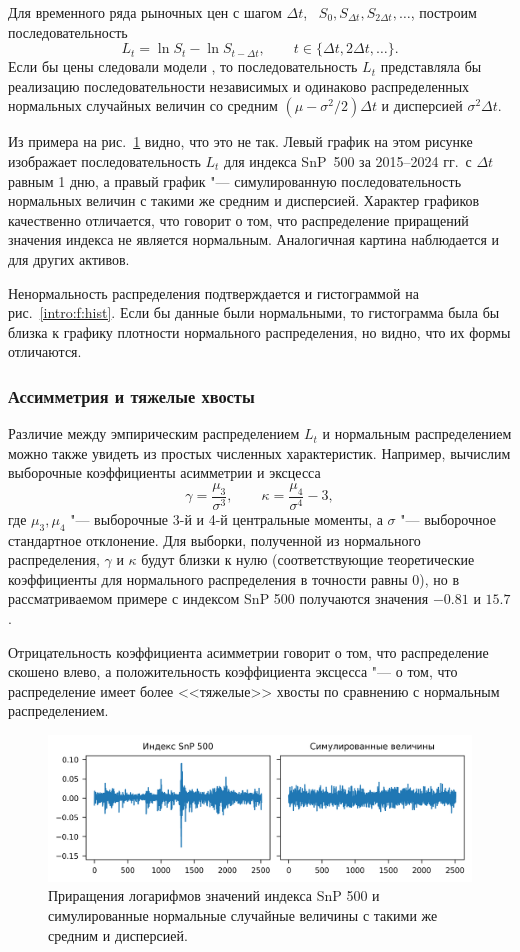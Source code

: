 Для временного ряда рыночных цен с шагом $\Delta t$, \te\ $S_0, S_{\Delta t}, S_{2\Delta t},\dots$, построим последовательность
\[
L_t = \ln S_t - \ln S_{t-\Delta t}, \qquad t\in \{\Delta t, 2\Delta t,\dots\}.
\]
Если бы цены следовали модели \bs, то последовательность $L_t$ представляла бы реализацию последовательности независимых и одинаково распределенных нормальных случайных величин со средним $(\mu-\sigma^2/2)\Delta t$ и дисперсией $\sigma^2\Delta t$.

Из примера на рис.~\ref{intro:f:real-vol} видно, что это не так.
Левый график на этом рисунке изображает последовательность $L_t$ для индекса SnP~500 за 2015--2024 гг.\ с $\Delta t$ равным 1 дню, а правый график "--- симулированную последовательность нормальных величин с такими же средним и дисперсией. 
Характер графиков качественно отличается, что говорит о том, что распределение приращений значения индекса не является нормальным.
Аналогичная картина наблюдается и для других активов.

Ненормальность распределения подтверждается и гистограммой на рис.~\ref{intro:f:hist}.
Если бы данные были нормальными, то гистограмма была бы близка к графику плотности нормального распределения, но видно, что их формы отличаются.


\subsubsection{Ассимметрия и тяжелые хвосты}

Различие между эмпирическим распределением $L_t$ и нормальным распределением можно также увидеть из простых численных характеристик.
Например, вычислим выборочные коэффициенты асимметрии и эксцесса
\[
\gamma = \frac{\mu_3}{\sigma^3}, \qquad \kappa = \frac{\mu_4}{\sigma^4} - 3,
\] 
где $\mu_3,\mu_4$ "--- выборочные 3-й и 4-й центральные моменты, а $\sigma$ "--- выборочное стандартное отклонение.
Для выборки, полученной из нормального распределения, $\gamma$ и $\kappa$ будут близки к нулю (соответствующие теоретические коэффициенты для нормального распределения в точности равны 0), но в рассматриваемом примере с индексом SnP 500 получаются значения $-0.81$ и $15.7$.

Отрицательность коэффициента асимметрии говорит о том, что распределение скошено влево, а положительность коэффициента эксцесса "--- о том, что распределение имеет более <<тяжелые>> хвосты по сравнению с нормальным распределением.

\begin{figure}[t]
\includegraphics{pic/snp-returns.png}
\centering
\caption{Приращения логарифмов значений индекса SnP 500 и симулированные нормальные случайные величины с такими же средним и дисперсией.}
\label{intro:f:real-vol}
\end{figure}


